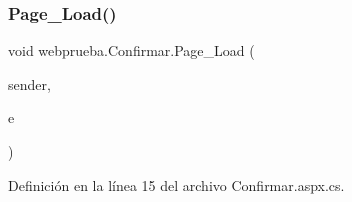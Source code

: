 \subsubsection{\texorpdfstring{Page\_Load()}{Page\_Load()}\hspace{0.1cm}{\footnotesize\ttfamily [1/2]}}
{\footnotesize\ttfamily void webprueba.\+Confirmar.\+Page\+\_\+\+Load (\begin{DoxyParamCaption}\item[{object}]{sender,  }\item[{Event\+Args}]{e }\end{DoxyParamCaption})\hspace{0.3cm}{\ttfamily [protected]}}



Definición en la línea 15 del archivo Confirmar.\+aspx.\+cs.



